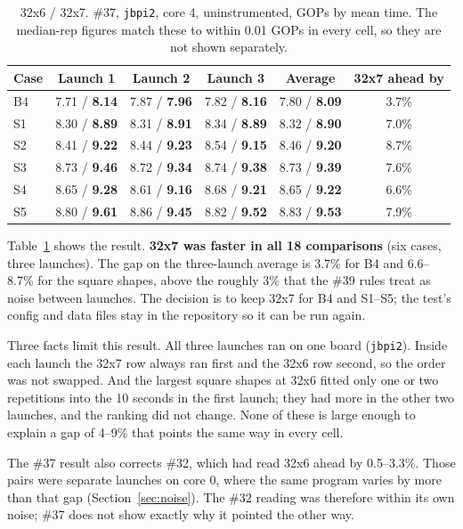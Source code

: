 \documentclass[11pt,a4paper]{article}
\newcommand{\good}[1]{\textcolor{green!45!black}{\textbf{#1}}}
\begin{document}
\begin{table}[h]
\centering\small
\begin{tabular}{@{}lccccc@{}}
\toprule
\textbf{Case} & \textbf{Launch 1} & \textbf{Launch 2} & \textbf{Launch 3} & \textbf{Average} & \textbf{32x7 ahead by} \\
\midrule
B4 & 7.71 / \good{8.14} & 7.87 / \good{7.96} & 7.82 / \good{8.16} & 7.80 / \good{8.09} & 3.7\% \\
S1 & 8.30 / \good{8.89} & 8.31 / \good{8.91} & 8.34 / \good{8.89} & 8.32 / \good{8.90} & 7.0\% \\
S2 & 8.41 / \good{9.22} & 8.44 / \good{9.23} & 8.54 / \good{9.15} & 8.46 / \good{9.20} & 8.7\% \\
S3 & 8.73 / \good{9.46} & 8.72 / \good{9.34} & 8.74 / \good{9.38} & 8.73 / \good{9.39} & 7.6\% \\
S4 & 8.65 / \good{9.28} & 8.61 / \good{9.16} & 8.68 / \good{9.21} & 8.65 / \good{9.22} & 6.6\% \\
S5 & 8.80 / \good{9.61} & 8.86 / \good{9.45} & 8.82 / \good{9.52} & 8.83 / \good{9.53} & 7.9\% \\
\bottomrule
\end{tabular}
\caption{32x6 / 32x7. \#37, \texttt{jbpi2}, core 4, uninstrumented, GOPs by mean time. The median-rep figures
match these to within 0.01 GOPs in every cell, so they are not shown separately.}
\label{tab:tile37}
\end{table}

Table~\ref{tab:tile37} shows the result. \textbf{32x7 was faster in all 18 comparisons} (six cases, three
launches). The gap on the three-launch average is 3.7\% for B4 and 6.6--8.7\% for the square shapes, above the
roughly 3\% that the \#39 rules treat as noise between launches. The decision is to keep 32x7 for B4 and S1--S5;
the test's config and data files stay in the repository so it can be run again.

Three facts limit this result. All three launches ran on one board (\texttt{jbpi2}). Inside each launch the
32x7 row always ran first and the 32x6 row second, so the order was not swapped. And the largest square shapes
at 32x6 fitted only one or two repetitions into the 10 seconds in the first launch; they had more in the other
two launches, and the ranking did not change. None of these is large enough to explain a gap of 4--9\% that
points the same way in every cell.

The \#37 result also corrects \#32, which had read 32x6 ahead by 0.5--3.3\%. Those pairs were separate launches
on core 0, where the same program varies by more than that gap (Section~\ref{sec:noise}). The \#32 reading was
therefore within its own noise; \#37 does not show exactly why it pointed the other way.
\end{document}
